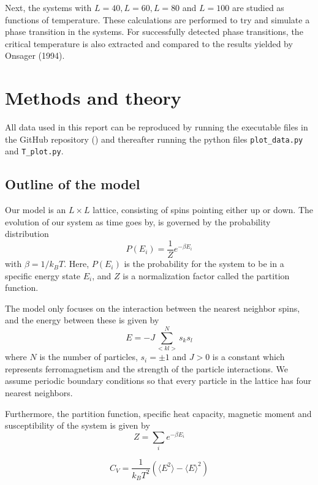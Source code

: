 \documentclass[12pt,english,a4paper]{article}
\begin{document}
Next, the systems with $L=40, L=60, L=80$ and $L=100$ are studied as functions of temperature. These calculations are performed to try and simulate a phase transition in the systems. For successfully detected phase transitions, the critical temperature is also extracted and compared to the results yielded by Onsager (1994).

\section{Methods and theory} \label{methods_and_theory}

All data used in this report can be reproduced by running the executable files in the GitHub repository (\cite{GitHub}) and thereafter running the python files \texttt{plot\_data.py} and \texttt{T\_plot.py}.

\subsection{Outline of the model}
Our model is an $L\times L$ lattice, consisting of spins pointing either up or down. The evolution of our system as time goes by, is governed by the probability distribution
\begin{equation}
    P(E_i) = \frac{1}{Z}e^{-\beta E_i}
    \label{eq:boltzmann}
\end{equation}
 with $\beta =1/k_B T$. Here, $P(E_i)$ is the probability for the system to be in a specific energy state $E_i$, and $Z$ is a normalization factor called the partition function.

The model only focuses on the interaction between the nearest neighbor spins, and the energy between these is given by
\begin{equation}
    E = -J \sum_{<kl>}^N s_ks_l 
    \label{eq:energy}
\end{equation}
where $N$ is the number of particles, $s_i=\pm 1$ and $J>0$ is a constant which represents ferromagnetism and the strength of the particle interactions. We assume periodic boundary conditions so that every particle in the lattice has four nearest neighbors. 

Furthermore, the partition function, specific heat capacity, magnetic moment and susceptibility of the system is given by
\begin{equation}
Z=\sum_i e^{-\beta E_i} \label{eq:partition} 
\end{equation}

\begin{equation}
C_V=\frac{1}{k_B T^2}\left(\langle E^2\rangle-\langle E\rangle^2\right)
\end{equation}
\end{document}
